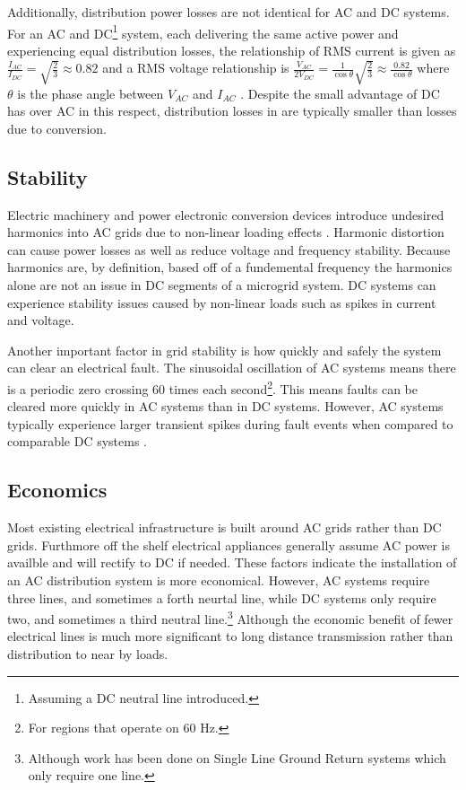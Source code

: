  

Additionally, distribution power losses are not identical for AC and DC systems. For an AC and DC\footnote{Assuming a DC neutral line introduced.} system, each delivering the same active power and experiencing equal distribution losses, the relationship of RMS current is given as $\frac{I_{AC}}{I_{DC}} = \sqrt{\frac{2}{3}} \approx 0.82$ and a RMS voltage relationship is $\frac{V_{AC}}{2V_{DC}} = \frac{1}{\cos{\theta}} \sqrt{\frac{2}{3}} \approx \frac{0.82}{\cos{\theta}}$ where $\theta$ is the phase angle between $V_{AC}$ and $I_{AC}$ \cite{Starke2008}. Despite the small advantage of DC has over AC in this respect, distribution losses in are typically smaller than losses due to conversion.

\subsection{Stability}
Electric machinery and power electronic conversion devices introduce undesired harmonics into AC grids due to non-linear loading effects \cite{Grotzbach1997}. Harmonic distortion can cause power losses as well as reduce voltage and frequency stability. Because harmonics are, by definition, based off of a fundemental frequency the harmonics alone are not an issue in DC segments of a microgrid system. DC systems can experience stability issues caused by non-linear loads such as spikes in current and voltage.

Another important factor in grid stability is how quickly and safely the system can clear an electrical fault. The sinusoidal oscillation of AC systems means there is a periodic zero crossing 60 times each second\footnote{For regions that operate on 60 Hz.}. This means faults can be cleared more quickly in AC systems than in DC systems.  However, AC systems typically experience larger transient spikes during fault events when compared to comparable DC systems \cite{Estes2011}. 

\subsection{Economics}
Most existing electrical infrastructure is built around AC grids rather than DC grids. Furthmore off the shelf electrical appliances generally assume AC power is availble and will rectify to DC if needed. These factors indicate the installation of an AC distribution system is more economical. However, AC systems require three lines, and sometimes a forth neurtal line, while DC systems only require two, and sometimes a third neutral line.\footnote{Although work has been done on Single Line Ground Return systems which only require one line.} Although the economic benefit of fewer electrical lines is much more significant to long distance transmission rather than distribution to near by loads.

